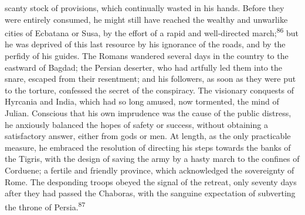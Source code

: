 scanty stock of provisions, which continually wasted in his
hands. Before they were entirely consumed, he might still have
reached the wealthy and unwarlike cities of Ecbatana or Susa, by
the effort of a rapid and well-directed march;\textsuperscript{86} but he was
deprived of this last resource by his ignorance of the roads, and
by the perfidy of his guides. The Romans wandered several days in
the country to the eastward of Bagdad; the Persian deserter, who
had artfully led them into the snare, escaped from their
resentment; and his followers, as soon as they were put to the
torture, confessed the secret of the conspiracy. The visionary
conquests of Hyrcania and India, which had so long amused, now
tormented, the mind of Julian. Conscious that his own imprudence
was the cause of the public distress, he anxiously balanced the
hopes of safety or success, without obtaining a satisfactory
answer, either from gods or men. At length, as the only
practicable measure, he embraced the resolution of directing his
steps towards the banks of the Tigris, with the design of saving
the army by a hasty march to the confines of Corduene; a fertile
and friendly province, which acknowledged the sovereignty of
Rome. The desponding troops obeyed the signal of the retreat,
only seventy days after they had passed the Chaboras, with the
sanguine expectation of subverting the throne of Persia.\textsuperscript{87}





